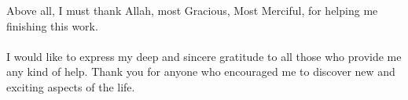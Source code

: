 Above all, I must thank Allah, most Gracious, Most Merciful, for helping me
finishing this work.
\\\\
I would like to express my deep and sincere gratitude to all those
who provide me any kind of help. Thank you for anyone who
encouraged me to discover new and exciting aspects of the life.